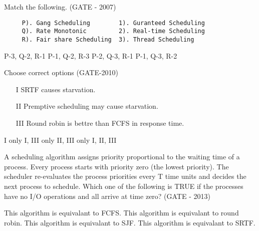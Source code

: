 \begin{questyle}

  \question Match the following. (GATE - 2007)

  \begin{lstlisting}
     P). Gang Scheduling        1). Guranteed Scheduling
     Q). Rate Monotonic         2). Real-time Scheduling
     R). Fair share Scheduling  3). Thread Scheduling

  \end{lstlisting}

  \begin{choices}
    \CorrectChoice P-3, Q-2, R-1
    \choice P-1, Q-2, R-3
    \choice P-2, Q-3, R-1
    \choice P-1, Q-3, R-2
  \end{choices}


  \end{questyle}


\begin{questyle}

  \question Choose correct options (GATE-2010)

   \begin{enumerate}
      \item[I] SRTF causes starvation.
      \item[II] Premptive scheduling may cause starvation.
      \item[III] Round robin is bettre than FCFS in response time.
   \end{enumerate}

  \begin{oneparchoices}
    \choice I only
    \choice I, III only
    \choice II, III only
    \CorrectChoice I, II, III
  \end{oneparchoices}

  \end{questyle}



\begin{questyle}

  \question  A scheduling algorithm assigns priority proportional to the waiting time of a process.
            Every process starts with priority zero (the lowest priority). The scheduler re-evaluates
            the process priorities every T time units and decides the next process to schedule.
            Which one of the following is TRUE if the processes have no I/O operations and all arrive at time zero? (GATE - 2013)

  \begin{choices}
    \choice This algorithm is equivalant to FCFS.
    \CorrectChoice This algorithm is equivalant to round robin.
    \choice This algorithm is equivalant to SJF.
    \choice This algorithm is equivalant to SRTF.
  \end{choices}


  \end{questyle}




